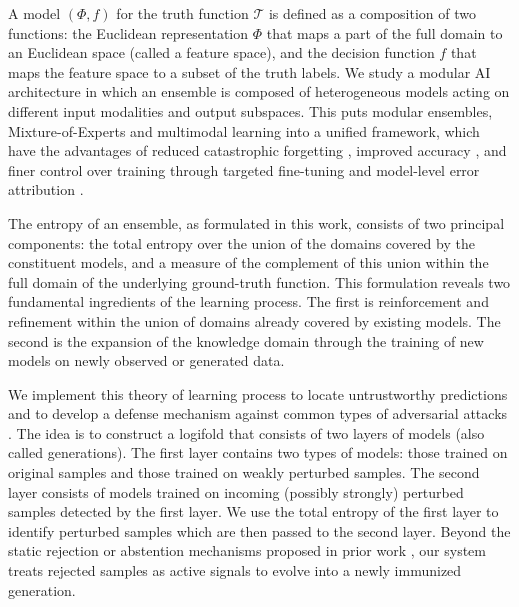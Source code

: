 \documentclass{article}
\theoremstyle{plain}
\theoremstyle{definition}
\theoremstyle{remark}
\newcommand{\cT}{\mathcal{T}}
\begin{document}
A model $(\Phi,f)$ for the truth function $\cT$ is defined as a composition of two functions: the Euclidean representation $\Phi$ that maps a part of the full domain to an Euclidean space (called a feature space), and the decision function $f$ that maps the feature space to a subset of the truth labels. 
We study a modular AI architecture \cite{society_of_mind,neural_module} in which an ensemble is composed of heterogeneous models acting on different input modalities and output subspaces. This puts modular ensembles, Mixture-of-Experts \cite{adaptive_MOE} and multimodal learning \cite{multimodal,multimodal_Boltzmann,multimodal_survey} into a unified framework, which have the advantages of reduced catastrophic forgetting \cite{Google_nested}, improved accuracy \cite{conditional_computation,Sparsely_Gated_MOE,scaling_giant_conditional,switch_transformers,transferable_visual_language}, and finer control over training through targeted fine-tuning and model-level error attribution \cite{ST_MoE}.

The entropy of an ensemble, as formulated in this work, consists of two principal components: the total entropy over the union of the domains covered by the constituent models, and a measure of the complement of this union within the full domain of the underlying ground-truth function.
This formulation reveals two fundamental ingredients of the learning process. The first is reinforcement and refinement \cite{stat_grad_RL,RL_book,  policy_grad_RL, human_deep_RL, trust_policy_optimization, ProximalPO, soft_actor_critic} within the union of domains already covered by existing models. The second is the expansion of the knowledge domain \cite{learning_domains,domain_inv_feature,domain_adv_train,lost_domain} through the training of new models on newly observed or generated data.


We implement this theory of learning process to locate untrustworthy predictions and to develop a defense mechanism against common types of adversarial attacks \cite{AdvGoodfellow,AdvCW,APGD,auto_attack}. The idea is to construct a logifold \cite{Jung-Lau2,Jung-Lau} that consists of two layers of models (also called generations). The first layer contains two types of models: those trained on original samples and those trained on weakly perturbed samples. The second layer consists of models trained on incoming (possibly strongly) perturbed samples detected by the first layer. We use the total entropy of the first layer to identify perturbed samples which are then passed to the second layer. Beyond the static rejection or abstention mechanisms proposed in prior work \cite{CARL, Pang2022, CPR}, our system treats rejected samples as active signals to evolve into a newly immunized generation.
\end{document}
